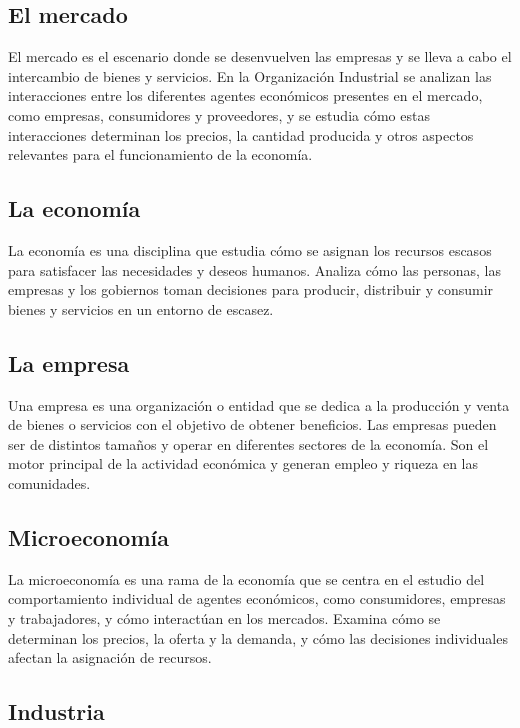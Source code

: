 \documentclass[
  doc,
  floatsintext,
  longtable,
  a4paper,
  nolmodern,
  notxfonts,
  notimes,
  12pt,
  colorlinks=true,linkcolor=blue,citecolor=blue,urlcolor=blue]{apa7}
\begin{document}
\subsection{El mercado}\label{el-mercado}

El mercado es el escenario donde se desenvuelven las empresas y se lleva
a cabo el intercambio de bienes y servicios. En la Organización
Industrial se analizan las interacciones entre los diferentes agentes
económicos presentes en el mercado, como empresas, consumidores y
proveedores, y se estudia cómo estas interacciones determinan los
precios, la cantidad producida y otros aspectos relevantes para el
funcionamiento de la economía.

\subsection{La economía}\label{la-economuxeda}

La economía es una disciplina que estudia cómo se asignan los recursos
escasos para satisfacer las necesidades y deseos humanos. Analiza cómo
las personas, las empresas y los gobiernos toman decisiones para
producir, distribuir y consumir bienes y servicios en un entorno de
escasez.

\subsection{La empresa}\label{la-empresa}

Una empresa es una organización o entidad que se dedica a la producción
y venta de bienes o servicios con el objetivo de obtener beneficios. Las
empresas pueden ser de distintos tamaños y operar en diferentes sectores
de la economía. Son el motor principal de la actividad económica y
generan empleo y riqueza en las comunidades.

\subsection{Microeconomía}\label{microeconomuxeda}

La microeconomía es una rama de la economía que se centra en el estudio
del comportamiento individual de agentes económicos, como consumidores,
empresas y trabajadores, y cómo interactúan en los mercados. Examina
cómo se determinan los precios, la oferta y la demanda, y cómo las
decisiones individuales afectan la asignación de recursos.

\subsection{Industria}\label{industria}
\end{document}
